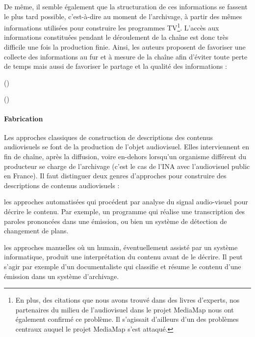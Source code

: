 De même, il semble également que la structuration de ces informations se fassent le plus tard possible, c'est-à-dire au moment de l'archivage, à partir des mêmes informations utilisées pour construire les programmes TV\footnote{En plus, des citations que nous avons trouvé dans des livres d'experts, nos partenaires du milieu de l'audiovisuel dans le projet MediaMap nous ont également confirmé ce problème. Il s'agissait d'ailleurs d'un des problèmes centraux auquel le projet MediaMap s'est attaqué.}.
L'accès aux informations constituées pendant le déroulement de la chaîne est donc très difficile une fois la production finie.
Ainsi, les auteurs proposent de favoriser une collecte des informations au fur et à mesure de la chaîne afin d'éviter toute perte de temps mais aussi de favoriser le partage et la qualité des informations : 

 (\cite[p.23, Metadata in the Workflow]{Austerberry2004})

 (\cite{Rayers2002})





\paragraph{Fabrication }
Les approches classiques de construction de descriptions des contenus audiovisuels se font  de la production de l'objet audiovisuel. 
Elles interviennent en fin de chaîne, après la diffusion, voire en-dehors lorsqu'un organisme différent du producteur se charge de l'archivage (c'est le cas de l'INA avec l'audiovisuel public en France). 
Il faut distinguer deux genres d'approches pour construire des descriptions de contenus audiovisuels : 
\begin{liste}
	\item les approches automatisées qui procédent par analyse du signal audio-visuel pour décrire le contenu.
	Par exemple, un programme qui réalise une transcription des paroles prononcées dans une émission, ou bien un système de détection de changement de plans. 

	\item les approches manuelles où un humain, éventuellement assisté par un système informatique, produit une interprétation du contenu avant de le décrire. 
	Il peut s'agir par exemple d'un documentaliste qui classifie et résume le contenu d'une émission dans un système d'archivage.
\end{liste}

